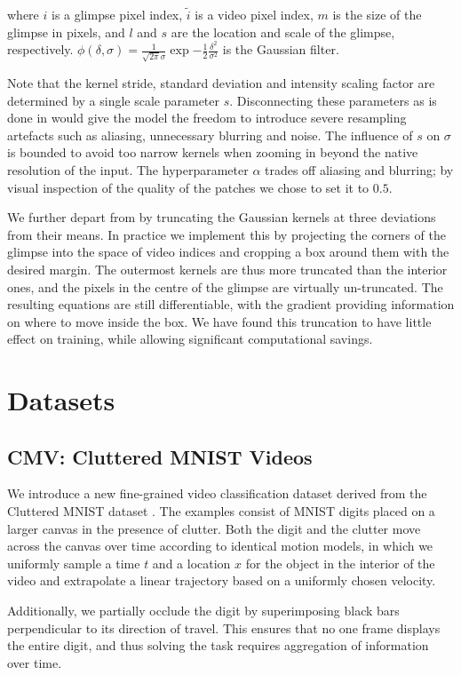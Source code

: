 \documentclass{article} %
\begin{document}
where $i$ is a glimpse pixel index, $\tilde{i}$ is a video pixel index, $m$ is the size of the glimpse in pixels, and $l$ and $s$ are the location and scale of the glimpse, respectively.
$\phi( \delta, \sigma ) = \frac{1}{\sqrt{2 \pi}\sigma} \exp{- \frac{1}{2} \frac{\delta^2}{\sigma^2}}$ is the Gaussian filter.

Note that the kernel stride, standard deviation and intensity scaling factor are determined by a single scale parameter $s$.
Disconnecting these parameters as is done in \cite{gregor2015draw} would give the model the freedom to introduce severe resampling artefacts such as aliasing, unnecessary blurring and noise.
The influence of $s$ on $\sigma$ is bounded to avoid too narrow kernels when zooming in beyond the native resolution of the input.
The hyperparameter $\alpha$ trades off aliasing and blurring; by visual inspection of the quality of the patches we chose to set it to $0.5$.

We further depart from \cite{draw} by truncating the Gaussian kernels at three deviations from their means.
In practice we implement this by projecting the corners of the glimpse into the space of video indices and cropping a box around them with the desired margin.
The outermost kernels are thus more truncated than the interior ones, and the pixels in the centre of the glimpse are virtually un-truncated.
The resulting equations are still differentiable, with the gradient providing information on where to move inside the box.
We have found this truncation to have little effect on training, while allowing significant computational savings.

\section{Datasets}
\subsection{CMV: Cluttered MNIST Videos}
We introduce a new fine-grained video classification dataset derived from the Cluttered MNIST dataset \cite{clutteredmnist}.
The examples consist of MNIST digits placed on a larger canvas in the presence of clutter.
Both the digit and the clutter move across the canvas over time according to identical motion models, in which we uniformly sample a time $t$ and a location $x$ for the object in the interior of the video and extrapolate a linear trajectory based on a uniformly chosen velocity.

Additionally, we partially occlude the digit by superimposing black bars perpendicular to its direction of travel.
This ensures that no one frame displays the entire digit, and thus solving the task requires aggregation of information over time.
\end{document}
